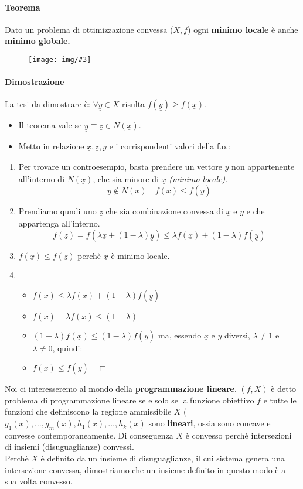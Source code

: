 \documentclass[12pt, twoside, letterpaper]{article}
\newcommand{\vx}[0]{
	\underline{x}
}
\newcommand{\vy}[0]{
	\underline{y}
}
\newcommand{\fx}[0]{
	f(\underline{x})
}
\newcommand{\fy}[0]{
	f(\underline{y})
}
\newcommand{\img}[3] {
	\begin{figure}[h]
		\caption*{#1}
		\centering
		\texttt{[image: img/\#3]}\\
	\end{figure}
}
\begin{document}
				\paragraph{Teorema} Dato un problema di ottimizzazione convessa ($X,f$) ogni \textbf{minimo locale} è anche \textbf{minimo globale.}
					\img{}{0.3}{img6.png}
					
				\paragraph{Dimostrazione} La tesi da dimostrare è: $\forall \underline{y} \in X$ risulta $f(\underline{y}) \geq f(\underline{x})$.
					\begin{itemize}
						\item Il teorema vale se $\underline{y} \equiv \underline{z} \in N(\underline{x})$.
						\item Metto in relazione $\underline{x}, \underline{z}, \underline{y}$ e i corrispondenti valori della f.o.:
					\end{itemize}
					
					\begin{enumerate}
						\item Per trovare un controesempio, basta prendere un vettore $\underline{y}$ non appartenente all'interno di $N(\underline{x})$, che sia minore di $\underline{x}$ \textit{(minimo locale)}. $$\underline{y} \notin N(x) \quad f(\underline{x}) \leq f(\underline{y})$$
						\item Prendiamo qundi uno $\underline{z}$ che sia combinazione convessa di $\underline{x}$ e $\underline{y}$ e che appartenga all'interno. $$f(\underline{z}) = f(\lambda \underline{x} + (1- \lambda) \underline{y}) \leq \lambda f(\underline{x}) + (1-\lambda) f(\underline{y})$$
						\item $f(\underline{x}) \leq f(\underline{z})$ perchè $\underline{x}$ è minimo locale.
						\item
							\begin{itemize}
								\item $\fx \leq \lambda \fx + (1-\lambda) \fy$
								\item $\fx - \lambda \fx \leq (1-\lambda)$
								\item $(1-\lambda) \fx \leq (1-\lambda) \fy$ ma, essendo $\vx$ e $\vy$ diversi, $\lambda \ne 1$ e $\lambda \ne 0$, quindi:
								\item $\fx \leq \fy \quad \Box$
							\end{itemize}
					\end{enumerate}
				Noi ci interesseremo al mondo della \textbf{programmazione lineare}. $(f,X)$ è detto problema di programmazione lineare se e solo se la funzione obiettivo $f$ e tutte le funzioni che definiscono la regione ammissibile $X$ ($g_1(\vx), \dots, g_m(\vx), h_1(\vx), \dots, h_k(\vx)$ sono \textbf{lineari}, ossia sono concave e convesse contemporaneamente. 				Di conseguenza $X$ è convesso perchè intersezioni di insiemi (disuguaglianze) convessi.\\
				Perchè $X$ è definito da un insieme di disuguaglianze, il cui sistema genera una intersezione convessa, dimostriamo che un insieme definito in questo modo è a sua volta convesso.
\end{document}
